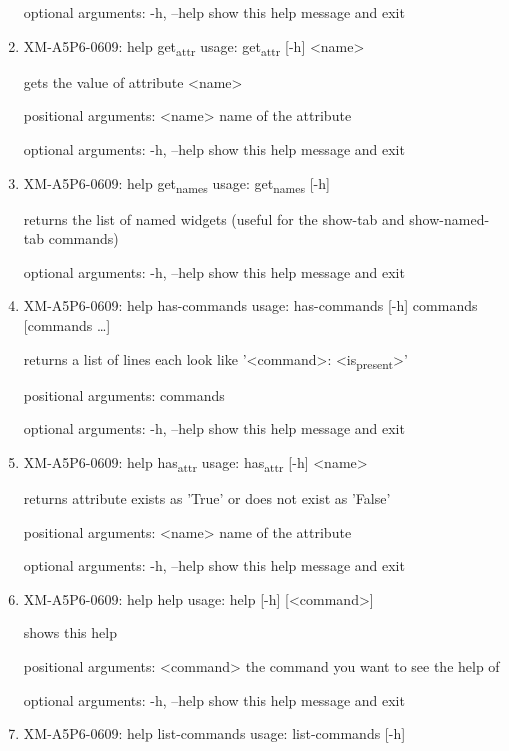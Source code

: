 \documentclass[11pt]{article}
\begin{document}
\begin{enumerate}
optional arguments:
  -h, --help  show this help message and exit

\item XM-A5P6-0609: help get\textsubscript{attr}
\label{sec:org3fcea7c}
usage: get\textsubscript{attr} [-h] <name>

gets the value of attribute <name>

positional arguments:
  <name>      name of the attribute

optional arguments:
  -h, --help  show this help message and exit

\item XM-A5P6-0609: help get\textsubscript{names}
\label{sec:org9bc12a6}
usage: get\textsubscript{names} [-h]

returns the list of named widgets (useful for the show-tab and show-named-tab
commands)

optional arguments:
  -h, --help  show this help message and exit

\item XM-A5P6-0609: help has-commands
\label{sec:orgc29c359}
usage: has-commands [-h] commands [commands \ldots{}]

returns a list of lines each look like '<command>: <is\textsubscript{present}>'

positional arguments:
  commands

optional arguments:
  -h, --help  show this help message and exit

\item XM-A5P6-0609: help has\textsubscript{attr}
\label{sec:orgd64fec2}
usage: has\textsubscript{attr} [-h] <name>

returns attribute exists as 'True' or does not exist as 'False'

positional arguments:
  <name>      name of the attribute

optional arguments:
  -h, --help  show this help message and exit

\item XM-A5P6-0609: help help
\label{sec:orgb0b4098}
usage: help [-h] [<command>]

shows this help

positional arguments:
  <command>   the command you want to see the help of

optional arguments:
  -h, --help  show this help message and exit

\item XM-A5P6-0609: help list-commands
\label{sec:org2b0cbd3}
usage: list-commands [-h]


\end{enumerate}
\end{document}
